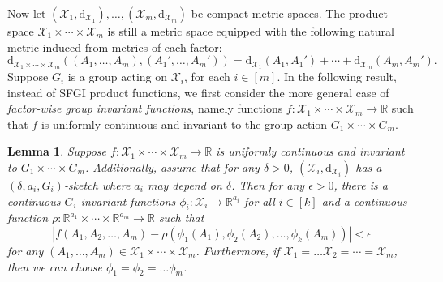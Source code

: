 \documentclass[12pt]{article}
\newcommand{\R}{\mathbb R}
\newtheorem{lemma}[theorem]{Lemma}
\newcommand{\yusu}[1]		{{ \textcolor{darkgreen} {{\sc [Yusu]:} #1}}}
\newcommand{\SFGI} {{SFGI}}
\begin{document}
Now let $(\mathcal{X}_1, \mathrm{d}_{\mathcal{X}_1}), \dots, (\mathcal{X}_m, \mathrm{d}_{\mathcal{X}_m})$ be compact metric spaces. 
The product space $\mathcal{X}_1 \times \cdots \times \mathcal{X}_m$ is still a metric space equipped with the following natural metric induced from metrics of each factor: 
    \begin{equation*}
        \mathrm{d}_{\mathcal{X}_1 \times \cdots \times \mathcal{X}_m}((A_1, \dots, A_m), (A_1', \dots, A_m')) = \mathrm{d}_{\mathcal{X}_1}(A_1, A_1') + \cdots + \mathrm{d}_{\mathcal{X}_m}(A_m, A_m').
    \end{equation*} 
Suppose $G_i$ is a group acting on $\mathcal{X}_i$, for each $i\in [m]$. 
In the following result, instead of \SFGI{} product functions, we first consider the more general case of \emph{factor-wise group invariant functions}, namely functions $f: \mathcal{X}_1 \times \cdots \times \mathcal{X}_m \to \R$ such that $f$ is uniformly continuous and invariant to the group action $G_1 \times \cdots \times G_m$. 
\begin{lemma}
\label{thm:product-network}
    Suppose $f: \mathcal{X}_1 \times \cdots \times \mathcal{X}_m \to \R$ is uniformly continuous and invariant to $G_1 \times \cdots \times G_m$. 
    Additionally, assume that for any $\delta > 0$, $(\mathcal{X}_i, \mathrm{d}_{\mathcal{X}_i})$ has a $(\delta, a_i, G_i)$-sketch where $a_i$ may depend on $\delta$. 
    Then for any $\epsilon > 0$, there is a continuous $G_i$-invariant functions $\phi_i: \mathcal{X}_i \to \R^{a_i}$ for all $i \in [k]$ and a {continuous} function $\rho: \R^{a_1} \times \cdots \times \R^{a_m} \to \R$ such that 
    \begin{equation*}
        |f(A_1, A_2, \dots, A_m) - \rho(\phi_1(A_1), \phi_2(A_2), \dots, \phi_k(A_m)) | < \epsilon
    \end{equation*}
    for any $(A_1, \dots, A_m) \in \mathcal{X}_1 \times \cdots \times \mathcal{X}_m$.
    \noindent Furthermore, if $\mathcal{X}_1= \ldots \mathcal{X}_2 = \cdots = \mathcal{X}_m$, then we can choose $\phi_1 = \phi_2 = \ldots \phi_m$. 
\end{lemma}
\end{document}

